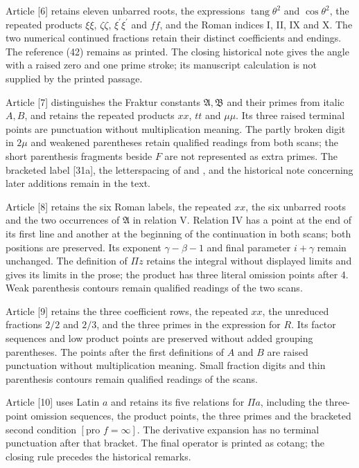 \par Article [6] retains eleven unbarred roots, the expressions $\operatorname{tang}\theta^2$ and $\cos\theta^2$, the repeated products $\xi\xi$, $\zeta\zeta$, $\xi^\prime\xi^\prime$ and $ff$, and the Roman indices I, II, IX and X. The two numerical continued fractions retain their distinct coefficients and endings. The reference (42) remains as printed. The closing historical note gives the angle with a raised zero and one prime stroke; its manuscript calculation is not supplied by the printed passage.

\par Article [7] distinguishes the Fraktur constants $\mathfrak{A},\mathfrak{B}$ and their primes from italic $A,B$, and retains the repeated products $xx$, $tt$ and $\mu\mu$. Its three raised terminal points are punctuation without multiplication meaning. The partly broken digit in $2\mu$ and weakened parentheses retain qualified readings from both scans; the short parenthesis fragments beside $F$ are not represented as extra primes. The bracketed label [31a], the letterspacing of  and , and the historical note concerning later additions remain in the text.

\par Article [8] retains the six Roman labels, the repeated $xx$, the six unbarred roots and the two occurrences of $\mathfrak{A}$ in relation V. Relation IV has a point at the end of its first line and another at the beginning of the continuation in both scans; both positions are preserved. Its exponent $\gamma-\beta-1$ and final parameter $i+\gamma$ remain unchanged. The definition of $\Pi z$ retains the integral without displayed limits and gives its limits in the prose; the product has three literal omission points after 4. Weak parenthesis contours remain qualified readings of the two scans.

\par Article [9] retains the three coefficient rows, the repeated $xx$, the unreduced fractions $2/2$ and $2/3$, and the three primes in the expression for $R$. Its factor sequences and low product points are preserved without added grouping parentheses. The points after the first definitions of $A$ and $B$ are raised punctuation without multiplication meaning. Small fraction digits and thin parenthesis contours remain qualified readings of the scans.

\par Article [10] uses Latin $a$ and retains its five relations for $\Pi a$, including the three-point omission sequences, the product points, the three primes and the bracketed second condition $[\text{pro }f=\infty]$. The derivative expansion has no terminal punctuation after that bracket. The final operator is printed as cotang; the closing rule precedes the historical remarks.

